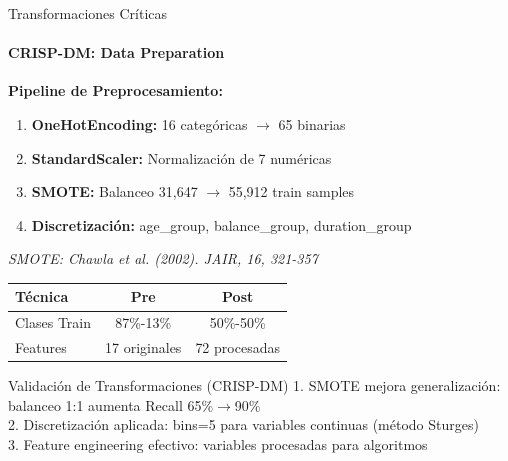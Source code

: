 \documentclass[10pt]{beamer}
\begin{document}
\begin{frame}{Transformaciones Críticas}
\framesubtitle{CRISP-DM: Data Preparation}

\textbf{Pipeline de Preprocesamiento:}

\begin{enumerate}
    \item \textbf{OneHotEncoding:} 16 categóricas $\rightarrow$ 65 binarias
    \item \textbf{StandardScaler:} Normalización de 7 numéricas
    \item \textbf{SMOTE:} Balanceo 31,647 $\rightarrow$ 55,912 train samples
    \item \textbf{Discretización:} age\_group, balance\_group, duration\_group
\end{enumerate}

\tiny \textit{SMOTE: Chawla et al. (2002). JAIR, 16, 321-357}

\vspace{0.3cm}
\begin{table}
\centering
\small
\begin{tabular}{lcc}
\toprule
\textbf{Técnica} & \textbf{Pre} & \textbf{Post} \\
\midrule
Clases Train & 87\%-13\% & 50\%-50\% \\
Features & 17 originales & 72 procesadas \\
\bottomrule
\end{tabular}
\end{table}

\begin{alertblock}{Validación de Transformaciones (CRISP-DM)}
\small
1. SMOTE mejora generalización: balanceo 1:1 aumenta Recall 65\%$\to$90\%\\
2. Discretización aplicada: bins=5 para variables continuas (método Sturges)\\
3. Feature engineering efectivo: variables procesadas para algoritmos
\end{alertblock}
\end{frame}
\end{document}

